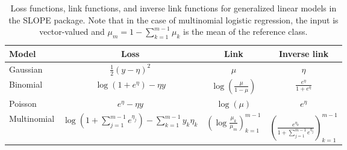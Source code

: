 \documentclass[a4paper,fleqn]{cas-sc}
\begin{document}
\begin{table}[pos=ht]
  \caption{
    Loss functions, link functions, and inverse link functions for generalized
    linear models in the SLOPE package. Note that in the case of multinomial
    logistic regression, the input is vector-valued and
    \(\mu_m = 1 - \sum_{k=1}^{m-1} \mu_k\) is the mean of the reference class.
  }
  \label{tab:glm}
  \centering

  \begin{tabular}{lccc}
    \toprule
    Model       &                                         Loss                                          &                          Link                           &                                   Inverse link                                    \\
    \midrule
    Gaussian    &                              \(\frac{1}{2}(y - \eta)^2\)                              &                         \(\mu\)                         &                                     \(\eta\)                                      \\
    Binomial    &                             \(\log(1 + e^\eta) - \eta y\)                             &       \(\log \left( \frac{\mu}{1 - \mu} \right)\)       &                           \(\frac{e^\eta}{1 + e^\eta}\)                           \\
    Poisson     &                                  \(e^\eta - \eta y\)                                  &                      \(\log(\mu)\)                      &                                    \(e^\eta\)                                     \\
    Multinomial & \(\log \left( 1 + \sum_{j=1}^{m-1} e^{\eta_j} \right) - \sum_{k=1}^{m-1} y_k \eta_k\) & \(\left( \log \frac{\mu_k}{\mu_m} \right)_{k=1}^{m-1}\) & \(\left( \frac{e^{\eta_k}}{1 + \sum_{j=1}^{m-1} e^{\eta_j}} \right)_{k=1}^{m-1}\) \\
    \bottomrule
  \end{tabular}
\end{table}
\end{document}
